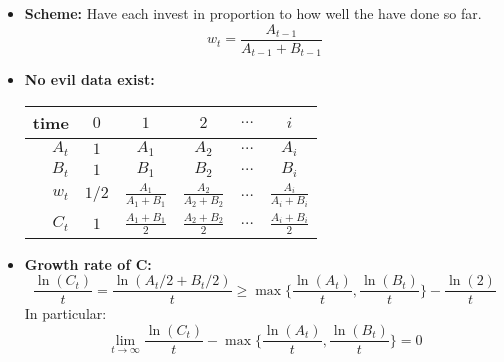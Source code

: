 \documentclass[12pt]{extarticle} %
\begin{document}
\begin{itemize}

\item {\bf Scheme:} Have each invest in proportion to how well the have
  done so far.
  \begin{displaymath}
    w_{t}=\frac{A_{t-1}}{A_{t-1}+B_{t-1}}
  \end{displaymath}

\item {\bf No evil data exist:}
\begin{center}
  \renewcommand{\arraystretch}{1.5} 
  \begin{tabular}{r|c|c|c|c|c}
    time  & $0$ & $1$   & $2$   & $\ldots$ & $i$   \\ \hline 
    $A_t$ & $1$ & $A_1$ & $A_2$ & $\ldots$ & $A_i$ \\
    $B_t$ & $1$ & $B_1$ & $B_2$ & $\ldots$ & $B_i$ \\ \hline
    $w_t$ & $1/2$ & $\frac{A_1}{A_1 +B_1}$ & $\frac{A_2}{A_2+B_2}$ & $\ldots $ &
    $\frac{A_i}{A_i+ B_i}$ \\
    $C_t$ & $1$ & $\frac{A_1+B_1}{2}$ & $\frac{A_2+B_2}{2}$ & $\ldots$
    & $\frac{A_i+B_i}{2}$
  \end{tabular}
  \renewcommand{\arraystretch}{1} 
\end{center}

\item {\bf Growth rate of C:} 
  \begin{displaymath}
    \frac{\ln(C_t)}{t} = \frac{\ln(A_t/2+B_t/2)}{t} \ge
    \max\{ \frac{\ln(A_t)}{t},\frac{\ln(B_t)}{t} \} - \frac{\ln(2)}{t} 
  \end{displaymath}
  In particular:
  \begin{displaymath}
    \lim_{t \to \infty} \frac{\ln(C_t)}{t} - \max\{
    \frac{\ln(A_t)}{t},\frac{\ln(B_t)}{t} \} = 0
  \end{displaymath}
\end{itemize}
\end{document}
